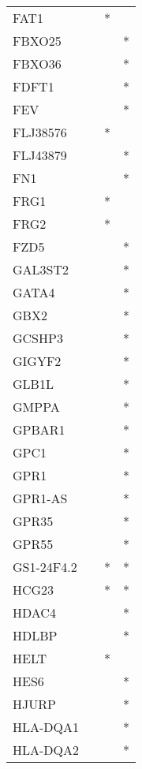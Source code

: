 \begin{longtable}{lccc}
FAT1           &       &  * &         \\
FBXO25         &       &    &       * \\
FBXO36         &       &    &       * \\
FDFT1          &       &    &       * \\
FEV            &       &    &       * \\
FLJ38576       &       &  * &         \\
FLJ43879       &       &    &       * \\
FN1            &       &    &       * \\
FRG1           &       &  * &         \\
FRG2           &       &  * &         \\
FZD5           &       &    &       * \\
GAL3ST2        &       &    &       * \\
GATA4          &       &    &       * \\
GBX2           &       &    &       * \\
GCSHP3         &       &    &       * \\
GIGYF2         &       &    &       * \\
GLB1L          &       &    &       * \\
GMPPA          &       &    &       * \\
GPBAR1         &       &    &       * \\
GPC1           &       &    &       * \\
GPR1           &       &    &       * \\
GPR1-AS        &       &    &       * \\
GPR35          &       &    &       * \\
GPR55          &       &    &       * \\
GS1-24F4.2     &       &  * &       * \\
HCG23          &       &  * &       * \\
HDAC4          &       &    &       * \\
HDLBP          &       &    &       * \\
HELT           &       &  * &         \\
HES6           &       &    &       * \\
HJURP          &       &    &       * \\
HLA-DQA1       &       &    &       * \\
HLA-DQA2       &       &    &       * \\

\end{longtable}
